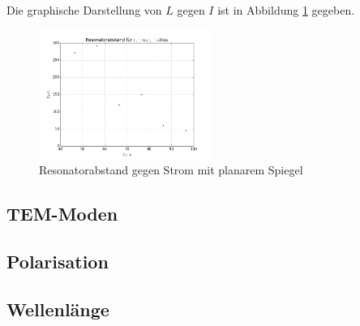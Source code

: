 \noindent Die graphische Darstellung von \(L\) gegen \(I\) ist in Abbildung \ref{fig:stabil2} gegeben.

\begin{figure}
	\centering
		\includegraphics[width=0.5\textwidth]{stabil2.png}
	\caption{Resonatorabstand gegen Strom mit planarem Spiegel}
	\label{fig:stabil2}
\end{figure}

\subsection{TEM-Moden}
\subsection{Polarisation}
\subsection{Wellenlänge}

